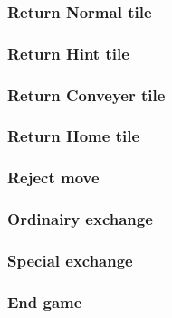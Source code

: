 	\subsubsection{Return Normal tile}
	

	\subsubsection{Return Hint tile}
	

	\subsubsection{Return Conveyer tile}
	

	\subsubsection{Return Home tile}
	


	\subsubsection{Reject move}
	


	\subsubsection{Ordinairy exchange}
	
	
	\subsubsection{Special exchange}
	
	
	\subsubsection{End game}
	
